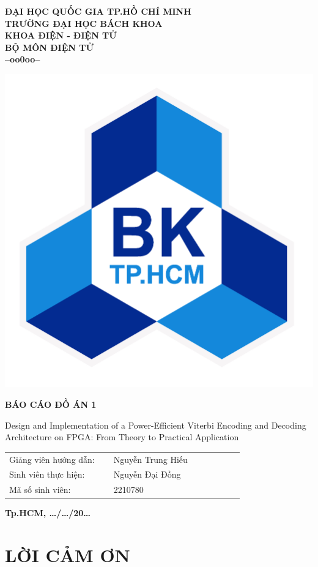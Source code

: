 \BgThispage
\begin{center}
	\Large\textbf{ĐẠI HỌC QUỐC GIA TP.HỒ CHÍ MINH \\ TRƯỜNG ĐẠI HỌC BÁCH KHOA\\ KHOA ĐIỆN - ĐIỆN TỬ \\ BỘ MÔN ĐIỆN TỬ \\--oo0oo--}
\end{center}
\vspace{0.4cm}
\begin{center}
	\includegraphics[width=0.3\linewidth]{sections/pic/01_logobachkhoatoi.png}
\end{center}
\vspace{0.4cm}
\begin{center}
	\LARGE\textbf{BÁO CÁO ĐỒ ÁN 1}
	\vspace{0.1cm}
	
	\Large{Design and Implementation of a Power-Efficient Viterbi
		Encoding and Decoding Architecture on FPGA: From
		Theory to Practical Application}
\end{center}
\vspace{1cm}

\LARGE

\hspace{2cm}\begin{tabular}{p{0.4\linewidth} p{0.5\linewidth}}
	Giảng viên hướng dẫn: & Nguyễn Trung Hiếu\\
	Sinh viên thực hiện:  & Nguyễn Đại Đồng \\
	Mã số sinh viên:      & 2210780
\end{tabular}

\vspace{5cm}
\begin{center}
	\fontsize{8pt}{5pt}\selectfont\textbf{Tp.HCM, \dots/\dots/20\dots}
\end{center}

\newpage
\pagestyle{fancy}
\fontsize{13}{14}\selectfont
{}
\section*{\centering LỜI CẢM ƠN}

